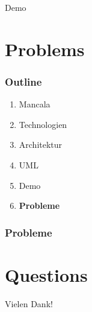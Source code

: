 \documentclass[
	10pt,
	t		%
]{beamer}
\begin{document}
\begin{frame}[plain, c]
\begin{center}
\Large Demo
\end{center}
\end{frame}

\section{Problems}
\begin{frame}
\frametitle{Outline}
\begin{enumerate}
\item Mancala
\item Technologien
\item Architektur
\item UML
\item Demo
\item \textbf{Probleme}
\end{enumerate}
\end{frame}

\begin{frame}
\frametitle{Probleme}

\end{frame}

\section{Questions}
\begin{frame}[plain, c]
\begin{center}
\Large Vielen Dank!
\end{center}
\end{frame}
\end{document}
